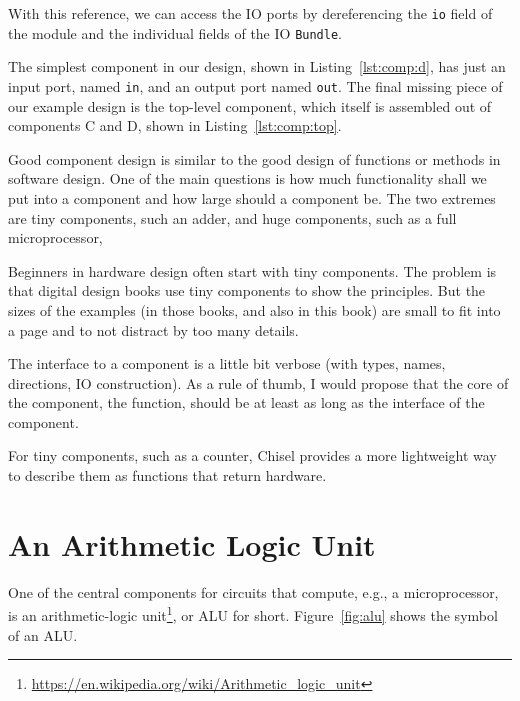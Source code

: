 \documentclass[%
    10pt,
    headinclude, footexclude,
    openright, %
    notitlepage,
    cleardoubleempty,
    headsepline,
    pointlessnumbers,
    bibtotoc, idxtotoc,
    ]{scrbook}
\newcommand{\code}[1]{{\small{\texttt{#1}}}}
\newcommand{\myref}[2]{\href{#1}{#2}}
\renewcommand{\myref}[2]{{#2}{\footnote{\url{#1}}}}
\begin{document}
With this reference, we can access the IO ports by dereferencing the \code{io} field of the module
and the individual fields of the IO \code{Bundle}.


The simplest component in our design, shown in Listing~\ref{lst:comp:d},
has just an input port, named \code{in}, and
an output port named \code{out}.
The final missing piece of our example design is the top-level component, which itself
is assembled out of components C and D, shown in Listing~\ref{lst:comp:top}.


Good component design is similar to the good design of functions or methods in
software design. One of the main questions is how much functionality shall we put into
a component and how large should a component be. The two extremes are tiny
components, such an adder, and huge components, such as a full microprocessor,

Beginners in hardware design often start with tiny components.
The problem is that digital design books use tiny components to show the principles.
But the sizes of the examples (in those books, and also in this book) are small
to fit into a page and to not distract by too many details.

The interface to a component is a little bit verbose (with types, names, directions,
IO construction). As a rule of thumb, I would propose that the core of the component,
the function, should be at least as long as the interface of the component.

For tiny components, such as a counter, Chisel provides a more lightweight
way to describe them as functions that return hardware.


\section{An Arithmetic Logic Unit}

One of the central components for circuits that compute, e.g., a microprocessor, is an
\myref{https://en.wikipedia.org/wiki/Arithmetic_logic_unit}{arithmetic-logic unit},
or ALU for short. Figure~\ref{fig:alu} shows the symbol of an ALU.

\end{document}
